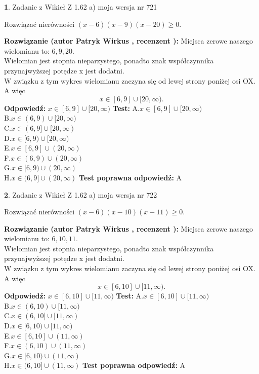 \documentclass[12pt, a4paper]{article}
\theoremstyle{definition} %
\newtheorem{zad}{}
\newcommand{\zadStart}[1]{\begin{zad}#1\newline}
\newcommand{\zadStop}{\end{zad}}
\newcommand{\rozwStart}[2]{\noindent \textbf{Rozwiązanie (autor #1 , recenzent #2): }\newline}
\newcommand{\rozwStop}{\newline}
\newcommand{\odpStart}{\noindent \textbf{Odpowiedź:}\newline}
\newcommand{\odpStop}{\newline}
\newcommand{\testStart}{\noindent \textbf{Test:}\newline}
\newcommand{\testStop}{\newline}
\newcommand{\kluczStart}{\noindent \textbf{Test poprawna odpowiedź:}\newline}
\newcommand{\kluczStop}{\newline}
\begin{document}
\zadStart{Zadanie z Wikieł Z 1.62 a) moja wersja nr 721}

Rozwiązać nierówności $(x-6)(x-9)(x-20)\ge0$.
\zadStop
\rozwStart{Patryk Wirkus}{}
Miejsca zerowe naszego wielomianu to: $6, 9, 20$.\\
Wielomian jest stopnia nieparzystego, ponadto znak współczynnika przy\linebreak najwyższej potędze x jest dodatni.\\ W związku z tym wykres wielomianu zaczyna się od lewej strony poniżej osi OX. A więc $$x \in [6,9] \cup [20,\infty).$$
\rozwStop
\odpStart
$x \in [6,9] \cup [20,\infty)$
\odpStop
\testStart
A.$x \in [6,9] \cup [20,\infty)$\\
B.$x \in (6,9) \cup [20,\infty)$\\
C.$x \in (6,9] \cup [20,\infty)$\\
D.$x \in [6,9) \cup [20,\infty)$\\
E.$x \in [6,9] \cup (20,\infty)$\\
F.$x \in (6,9) \cup (20,\infty)$\\
G.$x \in [6,9) \cup (20,\infty)$\\
H.$x \in (6,9] \cup (20,\infty)$
\testStop
\kluczStart
A
\kluczStop



\zadStart{Zadanie z Wikieł Z 1.62 a) moja wersja nr 722}

Rozwiązać nierówności $(x-6)(x-10)(x-11)\ge0$.
\zadStop
\rozwStart{Patryk Wirkus}{}
Miejsca zerowe naszego wielomianu to: $6, 10, 11$.\\
Wielomian jest stopnia nieparzystego, ponadto znak współczynnika przy\linebreak najwyższej potędze x jest dodatni.\\ W związku z tym wykres wielomianu zaczyna się od lewej strony poniżej osi OX. A więc $$x \in [6,10] \cup [11,\infty).$$
\rozwStop
\odpStart
$x \in [6,10] \cup [11,\infty)$
\odpStop
\testStart
A.$x \in [6,10] \cup [11,\infty)$\\
B.$x \in (6,10) \cup [11,\infty)$\\
C.$x \in (6,10] \cup [11,\infty)$\\
D.$x \in [6,10) \cup [11,\infty)$\\
E.$x \in [6,10] \cup (11,\infty)$\\
F.$x \in (6,10) \cup (11,\infty)$\\
G.$x \in [6,10) \cup (11,\infty)$\\
H.$x \in (6,10] \cup (11,\infty)$
\testStop
\kluczStart
A
\kluczStop
\end{document}
